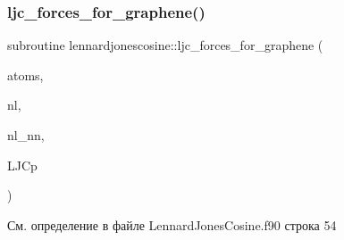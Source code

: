 \subsubsection{\texorpdfstring{ljc\+\_\+forces\+\_\+for\+\_\+graphene()}{ljc\_forces\_for\_graphene()}}
{\footnotesize\ttfamily subroutine lennardjonescosine\+::ljc\+\_\+forces\+\_\+for\+\_\+graphene (\begin{DoxyParamCaption}\item[{type(\mbox{\hyperlink{structmd__general_1_1particles}{particles}})}]{atoms,  }\item[{type(\mbox{\hyperlink{structmd__general_1_1neighbour__list}{neighbour\+\_\+list}})}]{nl,  }\item[{type(\mbox{\hyperlink{structmd__general_1_1neighbour__list}{neighbour\+\_\+list}})}]{nl\+\_\+nn,  }\item[{type(\mbox{\hyperlink{structlennardjonescosine_1_1lennardjonescosine__parameters}{lennardjonescosine\+\_\+parameters}})}]{L\+J\+Cp }\end{DoxyParamCaption})}



См. определение в файле Lennard\+Jones\+Cosine.\+f90 строка 54


